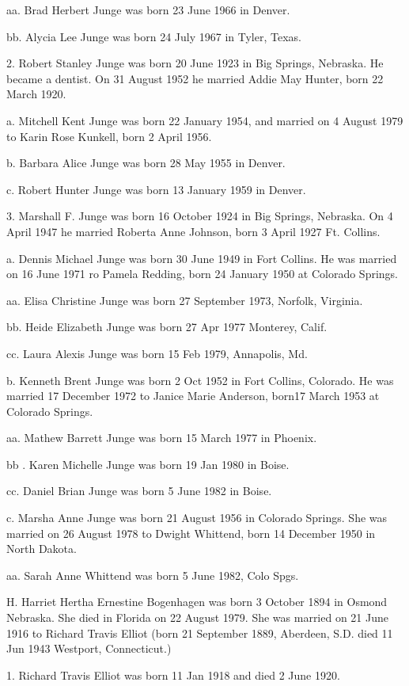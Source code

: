 \documentclass[a4paper]{article}
\begin{document}
aa. Brad Herbert Junge was born 23 June 1966 in Denver.

bb. Alycia Lee Junge was born 24 July 1967 in Tyler, Texas.

2.  Robert Stanley Junge was born 20 June 1923 in Big Springs, Nebraska.  He became a dentist.  On 31 August 1952 he married Addie May Hunter, born 22 March 1920.
 
a. Mitchell Kent Junge was born 22 January 1954, and married on 4 August 1979 to Karin Rose Kunkell, born 2 April 1956.
 
b. Barbara Alice Junge was born 28 May 1955 in Denver.

c. Robert Hunter Junge was born 13 January 1959 in Denver.

3. Marshall F. Junge was born 16 October 1924 in Big Springs, Nebraska.  On 4 April 1947 he married Roberta Anne Johnson, born 3 April 1927 Ft. Collins.

a. Dennis Michael Junge was born 30 June 1949 in Fort Collins.  He was married on 16 June 1971 ro Pamela Redding, born 24 January 1950 at Colorado Springs.

aa. Elisa Christine Junge was born 27 September 1973, Norfolk, Virginia.
 
bb. Heide Elizabeth Junge was born 27 Apr 1977 Monterey, Calif.

cc. Laura Alexis Junge was born 15 Feb 1979, Annapolis, Md.

b. Kenneth Brent Junge was born 2 Oct 1952 in Fort Collins, Colorado. He was married 17 December 1972 to Janice Marie Anderson, born17 March 1953 at Colorado Springs.

aa. Mathew Barrett Junge was born 15 March 1977 in Phoenix.

bb . Karen Michelle Junge was born 19 Jan 1980  in Boise.
				
cc. Daniel Brian Junge was born 5 June 1982 in Boise.

c. Marsha Anne Junge was born 21 August 1956 in Colorado Springs. She was married on 26 August 1978 to Dwight Whittend, born 14 December 1950 in North Dakota.

aa.  Sarah Anne Whittend was born 5 June 1982, Colo Spgs.

H. Harriet Hertha Ernestine Bogenhagen was born 3 October 1894 in Osmond Nebraska. She died in Florida on 22 August 1979.  She was married on 21 June 1916 to Richard Travis Elliot (born 21 September 1889, Aberdeen, S.D. died 11 Jun 1943 Westport, Connecticut.)

1. Richard Travis Elliot was born 11 Jan 1918 and died 2 June 1920.
\end{document}
